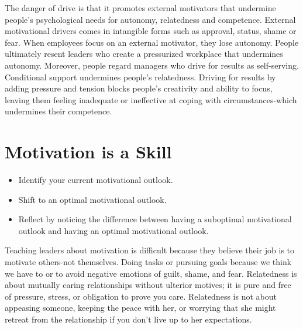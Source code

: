 \documentclass[ebook,12pt,oneside,openany]{memoir}
\begin{document}
The danger of drive is that it promotes external motivators that undermine people's psychological needs for autonomy, relatedness and competence.
External motivational drivers comes in intangible forms such as approval, status, shame or fear.
When employees focus on an external motivator, they lose autonomy. People ultimately resent leaders who create a pressurized workplace that undermines autonomy.
Moreover, people regard managers who drive for results as self-serving.
Conditional support undermines people's relatedness.
Driving for results by adding pressure and tension blocks people's creativity and ability to focus, leaving them feeling inadequate or ineffective at coping with circumstances-which undermines their competence.

\section{Motivation is a Skill}
\begin{itemize}
    \item Identify your current motivational outlook.
    \item Shift to an optimal motivational outlook.
    \item Reflect by noticing the difference between having a suboptimal motivational outlook and having an optimal motivational outlook.
\end{itemize}

Teaching leaders about motivation is difficult because they believe their job is to motivate others-not themselves.
Doing tasks or pursuing goals because we think we have to or to avoid negative emotions of guilt, shame, and fear.
Relatedness is about mutually caring relationships without ulterior motives; it is pure and free of pressure, stress, or obligation to prove you care.
Relatedness is not about appeasing someone, keeping the peace with her, or worrying that she might retreat from the relationship if you don't live up to her expectations.
\end{document}
